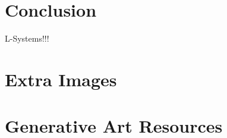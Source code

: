 \documentclass[12pt,twoside]{reedthesis}
\begin{document}




\chapter{Conclusion}
	\setcounter{section}{0}
	
	L-Systems!!!
	
	


    \appendix
      \chapter{Extra Images}
      
      \chapter{Generative Art Resources}

\backmatter 
\nocite{*}


 
\end{document}
